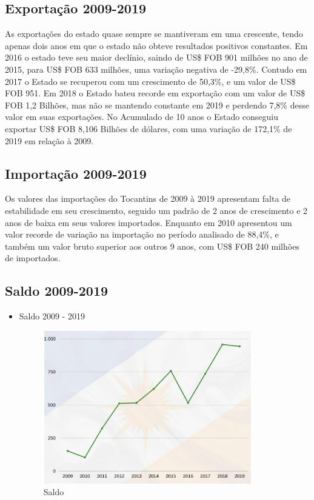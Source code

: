 \subsection {Exportação 2009-2019}
\par As exportações do estado quase sempre se mantiveram em uma crescente, tendo
apenas dois anos em que o estado não obteve resultados positivos constantes. Em 2016 o estado teve seu maior declínio, saindo de US\$ FOB 901 milhões no ano de 2015, para US\$ FOB 633 milhões, uma variação negativa de  -29,8\%. 
Contudo em 2017 o Estado se recuperou com um crescimento de 50,3\%, e um valor de US\$ FOB 951. Em 2018 o Estado bateu recorde em exportação com um valor de US\$ FOB 1,2 Bilhões, mas não se mantendo constante em 2019 e perdendo 7,8\% desse valor em suas exportações.
No Acumulado de 10 anos o Estado conseguiu exportar US\$ FOB 8,106 Bilhões de dólares, com uma variação de 172,1\% de 2019 em relação à 2009.

\subsection {Importação 2009-2019}
\par Os valores das importações do Tocantins de 2009 à 2019 apresentam falta de estabilidade em seu crescimento, seguido um padrão de 2 anos de crescimento e 2 anos de baixa em seus valores importados. Enquanto em 2010 apresentou um valor recorde de variação na importação no período analisado de 88,4\%, e também um valor bruto superior aos outros 9 anos, com US\$ FOB 240 milhões de importados.

\newpage 
\subsection {Saldo 2009-2019}
\begin{itemize}
	\item {Saldo 2009 - 2019}
	\begin{figure}[h]
	\caption{Saldo}
	\includegraphics[width=\linewidth]{fig/sal1.png}
\end{figure}
\end{itemize}


